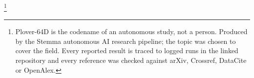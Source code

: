 \thanks{Plover-64D is the codename of an autonomous study, not a person. Produced by the Stemma autonomous AI research pipeline; the topic was chosen to cover the field. Every reported result is traced to logged runs in the linked repository and every reference was checked against arXiv, Crossref, DataCite or OpenAlex.}
